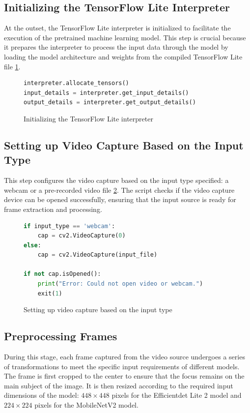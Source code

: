 \subsection{Initializing the TensorFlow Lite Interpreter}
At the outset, the TensorFlow Lite interpreter is initialized to facilitate the execution of the pretrained machine learning model. This step is crucial because it prepares the interpreter to process the input data through the model by loading the model architecture and weights from the compiled TensorFlow Lite file \ref{code:init_interpreter}.

\begin{figure}[H]
\begin{lstlisting}[language=Python]
interpreter.allocate_tensors()
input_details = interpreter.get_input_details()
output_details = interpreter.get_output_details()
\end{lstlisting}
\caption{Initializing the TensorFlow Lite interpreter}
\label{code:init_interpreter}
\end{figure}

\subsection{Setting up Video Capture Based on the Input Type}
This step configures the video capture based on the input type specified: a webcam or a pre-recorded video file \ref{code:video_input}. The script checks if the video capture device can be opened successfully, ensuring that the input source is ready for frame extraction and processing.

\begin{figure}[H]
\begin{lstlisting}[language=Python]
if input_type == 'webcam':
    cap = cv2.VideoCapture(0)
else:
    cap = cv2.VideoCapture(input_file)

if not cap.isOpened():
    print("Error: Could not open video or webcam.")
    exit(1)
\end{lstlisting}
\caption{Setting up video capture based on the input type}
\label{code:video_input}
\end{figure}

\subsection{Preprocessing Frames}
During this stage, each frame captured from the video source undergoes a series of transformations to meet the specific input requirements of different models. The frame is first cropped to the center to ensure that the focus remains on the main subject of the image. It is then resized according to the required input dimensions of the model: $448 \times 448$ pixels for the Efficientdet Lite 2 model and $224 \times 224$ pixels for the MobileNetV2 model.

